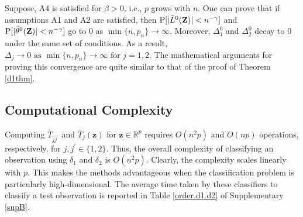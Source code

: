 \documentclass[twoside]{article}
\def\log{\hbox{log}}
\newcommand{\bZ}{\mathbf{Z}}
\newcommand{\bF}{\mathbf{F}}
\newcommand{\bz}{\mathbf{z}}
\newcommand{\0}{\mathbf{0}}
\newcommand{\1}{\mathbf{1}}
\numberwithin{equation}{section}
\begin{document}
Suppose, A4 is satisfied for $\beta>0$, i.e., $p$ grows with $n$. One can prove that if assumptions A1 and A2 are satisfied, then ${\rm P}[|\bar{L}^0(\bZ)|< n^{-\gamma}]$ and ${\rm P}[|\bar{\theta}^0(\bZ)|< n^{-\gamma}]$ go to 0 as $\min\{n,p_n\}\to\infty$. Moreover, $\Delta^0_1$ and $\Delta^0_{2}$ decay to 0 under the same set of conditions. As a result, $\Delta_{j}\to 0\text{ as }\min\{n,p_n\}\to\infty\text{ for }j=1,2.$ The mathematical arguments for proving this convergence are quite similar to that of the proof of Theorem \ref{d1thm}.
\subsection{Computational Complexity}
Computing $\bar{T}_{jj^\prime}$ and $\bar{T}_j(\bz)$ for $\bz\in\mathbb{R}^p$ requires $O(n^2p)$ and $O(np)$ operations, respectively, for $j,j^\prime\in\{1,2\}$. Thus, the overall complexity of classifying an observation using $\delta_1$ and $\delta_2$ is $O(n^2p)$. Clearly, the complexity scales linearly with $p$. This makes the methods advantageous when the classification problem is particularly high-dimensional. The average time taken by these classifiers to classify a test observation is reported in Table \ref{order.d1.d2} of Supplementary \ref{supB}. %

\end{document}
